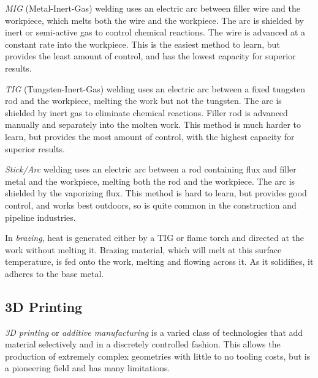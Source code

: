 \documentclass[10pt,letterpaper]{book}
\begin{document}
 	\begin{asparaenum}[a)]
 		\item \textit{MIG} (Metal-Inert-Gas) welding uses an electric arc between filler wire and the workpiece, which melts both the wire and the workpiece. The arc is shielded by inert or semi-active gas to control chemical reactions. The wire is advanced at a constant rate into the workpiece. This is the easiest method to learn, but provides the least amount of control, and has the lowest capacity for superior results.
 		
 		\item \textit{TIG} (Tungsten-Inert-Gas) welding uses an electric arc between a fixed tungsten rod and the workpiece, melting the work but not the tungsten. The arc is shielded by inert gas to eliminate chemical reactions. Filler rod is advanced manually and separately into the molten work. This method is much harder to learn, but provides the most amount of control, with the highest capacity for superior results.
 		
 		\item \textit{Stick/Arc} welding uses an electric arc between a rod containing flux and filler metal and the workpiece, melting both the rod and the workpiece. The arc is shielded by the vaporizing flux. This method is hard to learn, but provides good control, and works best outdoors, so is quite common in the construction and pipeline industries.
 		
 		\item In \textit{brazing}, heat is generated either by a TIG or flame torch and directed at the work without melting it. Brazing material, which will melt at this surface temperature, is fed onto the work, melting and flowing across it. As it solidifies, it adheres to the base metal.
 		
 	\end{asparaenum}
 	
 	\subsection{3D Printing}
 	
 	\textit{3D printing} or \textit{additive manufacturing} is a varied class of technologies that add material selectively and in a discretely controlled fashion. This allows the production of extremely complex geometries with little to no tooling costs, but is a pioneering field and has many limitations.
 	
\end{document}
